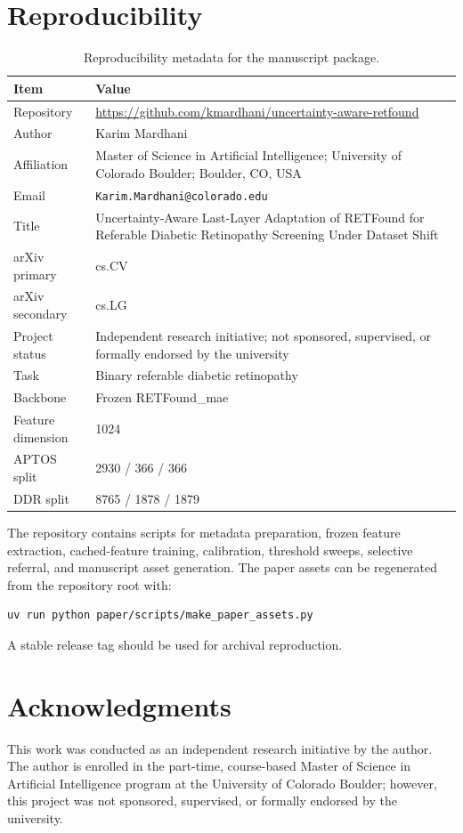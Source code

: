 \documentclass[11pt]{article}
\begin{document}
\section{Reproducibility}
\begin{table}[t]
\centering
\footnotesize
\caption{Reproducibility metadata for the manuscript package.}
\label{tab:reproducibility}
\begin{tabularx}{\textwidth}{p{}X}
\toprule
Item & Value \\
\midrule
Repository & \url{https://github.com/kmardhani/uncertainty-aware-retfound} \\
Author & Karim Mardhani \\
Affiliation & Master of Science in Artificial Intelligence; University of Colorado Boulder; Boulder, CO, USA \\
Email & \nolinkurl{Karim.Mardhani@colorado.edu} \\
Title & Uncertainty-Aware Last-Layer Adaptation of RETFound for Referable Diabetic Retinopathy Screening Under Dataset Shift \\
arXiv primary & cs.CV \\
arXiv secondary & cs.LG \\
Project status & Independent research initiative; not sponsored, supervised, or formally endorsed by the university \\
Task & Binary referable diabetic retinopathy \\
Backbone & Frozen RETFound\_mae \\
Feature dimension & 1024 \\
APTOS split & 2930 / 366 / 366 \\
DDR split & 8765 / 1878 / 1879 \\
\bottomrule
\end{tabularx}
\end{table}

The repository contains scripts for metadata preparation, frozen feature extraction, cached-feature training, calibration, threshold sweeps, selective referral, and manuscript asset generation. The paper assets can be regenerated from the repository root with:
\begin{verbatim}
uv run python paper/scripts/make_paper_assets.py
\end{verbatim}
A stable release tag should be used for archival reproduction.

\section*{Acknowledgments}
This work was conducted as an independent research initiative by the author. The author is enrolled in the part-time, course-based Master of Science in Artificial Intelligence program at the University of Colorado Boulder; however, this project was not sponsored, supervised, or formally endorsed by the university.
\end{document}
